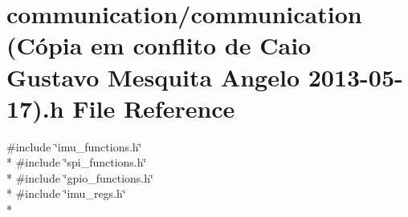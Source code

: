 \hypertarget{communication_01_07C_xC3_xB3pia_01em_01conflito_01de_01Caio_01Gustavo_01Mesquita_01Angelo_012013-05-17_08_8h}{\section{communication/communication (Cópia em conflito de Caio Gustavo Mesquita Angelo 2013-\/05-\/17).h File Reference}
\label{communication_01_07C_xC3_xB3pia_01em_01conflito_01de_01Caio_01Gustavo_01Mesquita_01Angelo_012013-05-17_08_8h}
}
{\ttfamily \#include \char`\"{}imu\-\_\-functions.\-h\char`\"{}}\\*
{\ttfamily \#include \char`\"{}spi\-\_\-functions.\-h\char`\"{}}\\*
{\ttfamily \#include \char`\"{}gpio\-\_\-functions.\-h\char`\"{}}\\*
{\ttfamily \#include \char`\"{}imu\-\_\-regs.\-h\char`\"{}}\\*
